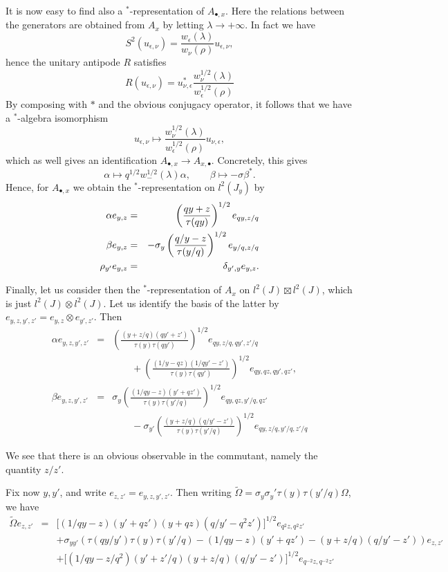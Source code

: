 It is now easy to find also a $^*$-representation of $A_{\bullet,x}$. Here the relations between the generators are obtained from $A_{x}$ by letting $\lambda\rightarrow +\infty$. In fact we have \[S^2(u_{\epsilon,\nu}) = \frac{w_{\epsilon}(\lambda)}{w_{\nu}(\rho)} u_{\epsilon,\nu},\] hence the unitary antipode $R$ satisfies \[ R(u_{\epsilon,\nu}) = u_{\nu,\epsilon}^* \frac{w_{\nu}^{1/2}(\lambda)}{w_{\epsilon}^{1/2}(\rho)}\] By composing with $*$ and the obvious conjugacy operator, it follows that we have a $^*$-algebra isomorphism \[u_{\epsilon,\nu} \mapsto  \frac{w_{\nu}^{1/2}(\lambda)}{w_{\epsilon}^{1/2}(\rho)}u_{\nu,\epsilon},\] which as well gives an identification $A_{\bullet,x}\rightarrow A_{x,\bullet}$. Concretely, this gives \[\alpha \mapsto q^{1/2}w_{-}^{1/2}(\lambda) \alpha,\qquad \beta \mapsto -\sigma\beta^*.\] Hence, for $A_{\bullet,x}$ we obtain the $^*$-representation on $l^2(J_{y})$ by \begin{eqnarray*} \alpha e_{y,z} &=&  \left(\frac{qy+z}{\operatorname{\tau}(qy)}\right)^{1/2}e_{qy,z/q}\\ \beta e_{y,z} &=&  - \sigma_{y} \left( \frac{q/y-z}{\operatorname{\tau}(y/q)}\right)^{1/2}e_{y/q,z/q}\\ \rho_{y'}e_{y,z} &=& \delta_{y',y}e_{y,z}.\end{eqnarray*}

Finally, let us consider then the $^*$-representation of $A_{x}$ on $l^2(J)\boxtimes l^2(J)$, which is just $l^2(J)\otimes l^2(J)$. Let us identify the basis of the latter by $e_{y,z,y',z'} = e_{y,z}\otimes e_{y',z'}$. Then \begin{eqnarray*} \alpha e_{y,z,y',z'} &=& \left(\frac{(y+z/q)(qy'+z')}{\tau(y)\tau(qy')}\right)^{1/2}e_{qy,z/q,qy',z'/q}  \\ && \qquad + \left(\frac{(1/y-qz)(1/qy' -z')}{\tau(y)\tau(qy')}\right)^{1/2}e_{qy,qz,qy',qz'}, \\
\beta e_{y,z,y',z'} &=&  \sigma_y \left(\frac{(1/qy-z)(y'+qz')}{\tau(y)\tau(y'/q)}\right)^{1/2}e_{qy,qz,y'/q,qz'}  \\ &&\qquad -\sigma_{y'}\left(\frac{(y+z/q)(q/y'-z')}{\tau(y)\tau(y'/q)}\right)^{1/2} e_{qy,z/q,y'/q,z'/q}
\end{eqnarray*}

We see that there is an obvious observable in the commutant, namely the quantity $z/z'$. 

Fix now $y,y'$, and write $e_{z,z'} = e_{y,z,y',z'}$. Then writing $\tilde{\Omega} =  \sigma_y\sigma_y'\tau(y)\tau(y'/q) \Omega$, we have \begin{eqnarray*}  \tilde{\Omega} e_{z,z'} &=& \lbrack (1/qy-z)(y'+qz')(y+qz)(q/y'-q^2z')\rbrack^{1/2} e_{q^2z,q^2z'} \\ && + \sigma_{yy'} \left(\tau(qy/y')\tau(y)\tau(y'/q) - (1/qy-z)(y'+qz') - (y+z/q)(q/y'-z')\right) e_{z,z'} \\ && + \lbrack (1/qy-z/q^2)(y'+z'/q)(y+z/q)(q/y'-z')\rbrack^{1/2} e_{q^{-2}z,q^{-2}z'}
\end{eqnarray*}



